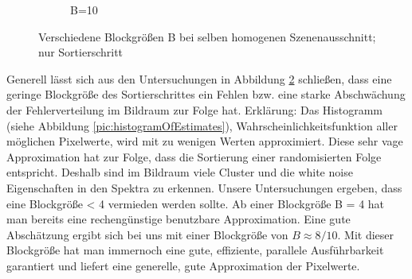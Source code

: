 \begin{figure}[H]
\begin{tcolorbox}[boxrule=4pt,sharp corners=downhill,title=Verschiedene Blockgrößen]
\begin{subfigure}[b]{0.2\linewidth}
         \caption{B=10}
         \label{pic:screen_B10}
    \end{subfigure}
    \end{tcolorbox}
    \caption{Verschiedene Blockgrößen B bei selben homogenen Szenenausschnitt; nur Sortierschritt}
    \label{fig:VerschiedeneBlockgrößenSorting}
\end{figure}

Generell lässt sich aus den Untersuchungen in Abbildung \ref{fig:VerschiedeneBlockgrößenSorting} schließen,
dass eine geringe Blockgröße des Sortierschrittes ein Fehlen bzw. eine starke Abschwächung der 
 Fehlerverteilung im Bildraum zur Folge hat. Erklärung: Das Histogramm
(siehe Abbildung \ref{pic:histogramOfEstimates}), Wahrscheinlichkeitsfunktion
aller möglichen Pixelwerte, wird mit zu wenigen Werten approximiert. Diese sehr vage Approximation 
hat zur Folge, dass die Sortierung einer randomisierten Folge entspricht. Deshalb sind im Bildraum
viele Cluster und die white noise Eigenschaften in den Spektra zu erkennen.
Unsere Untersuchungen ergeben, dass eine Blockgröße < 4 vermieden werden sollte. Ab einer Blockgröße
B = 4 hat man bereits eine rechengünstige benutzbare Approximation. Eine gute Abschätzung ergibt sich 
bei uns mit einer Blockgröße von $B \approx 8/10$. Mit dieser Blockgröße hat man immernoch eine gute, 
effiziente, parallele Ausführbarkeit garantiert und liefert eine generelle, gute Approximation der 
Pixelwerte.   


